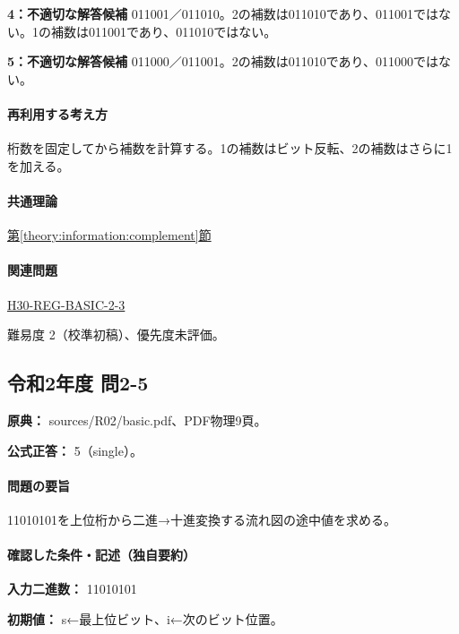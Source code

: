 \noindent\textbf{4：不適切な解答候補} 011001／011010。2の補数は011010であり、011001ではない。1の補数は011001であり、011010ではない。\par

\noindent\textbf{5：不適切な解答候補} 011000／011001。2の補数は011010であり、011000ではない。\par

\paragraph{再利用する考え方} 桁数を固定してから補数を計算する。1の補数はビット反転、2の補数はさらに1を加える。

\paragraph{共通理論} \hyperref[theory:information:complement]{第\ref*{theory:information:complement}節}

\paragraph{関連問題} \hyperref[q:h30-reg-basic-2-3]{H30-REG-BASIC-2-3}

\par 難易度 2（校準初稿）、優先度未評価。

\subsection{令和2年度 問2-5}
\label{q:r02-reg-basic-2-5}

\noindent\textbf{原典：} sources/R02/basic.pdf、PDF物理9頁。

\textbf{公式正答：} 5（single）。

\paragraph{問題の要旨} 11010101を上位桁から二進→十進変換する流れ図の途中値を求める。

\paragraph{確認した条件・記述（独自要約）}\mbox{}\par

\noindent\textbf{入力二進数：} 11010101\par

\noindent\textbf{初期値：} s←最上位ビット、i←次のビット位置。\par

